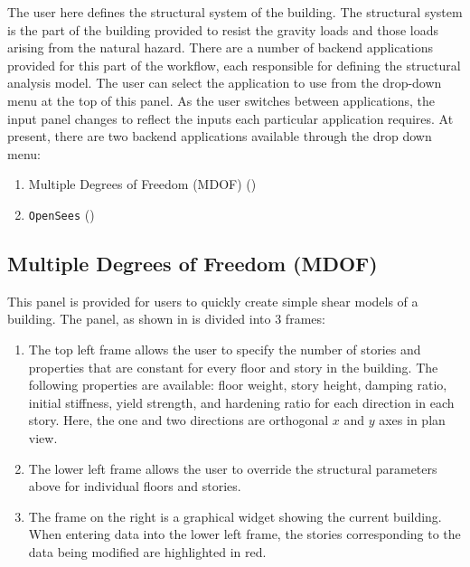 The user here defines the structural system of the
building. The  structural system is the part of the building provided
to resist the gravity loads and those loads arising from the natural hazard. 
There are a number of backend applications provided for this part of the workflow, 
each responsible for defining the structural analysis model. The user can select 
the application to use from the drop-down menu at the top of this panel. As the 
user switches between applications,
the input panel changes to reflect the inputs each particular application requires. At present, there are two backend applications
available through the drop down menu: 

\begin{enumerate}
\item Multiple Degrees of Freedom (MDOF) ()
\item \texttt{OpenSees} ()
\end{enumerate}

\subsection{Multiple Degrees of Freedom (MDOF)}\label{sec:MDOF}

This panel is provided for users to quickly create simple shear models
of a building. The panel, as shown in  is divided
into 3 frames:
\begin{enumerate}
\item The top left frame allows the user to specify the number of stories and properties that are constant for every floor and story in the building. The following properties are available: floor weight, story height, damping ratio, initial stiffness, yield strength, and hardening ratio for each direction in each story. Here, the one and two directions are orthogonal $x$ and $y$ axes in plan view.
\item The lower left frame allows the user to override the structural parameters above for individual floors and stories. 
\item The frame on the right is a graphical widget showing the current building. When entering data into the lower left frame, the stories corresponding to the data being modified are highlighted in red.
\end{enumerate}


